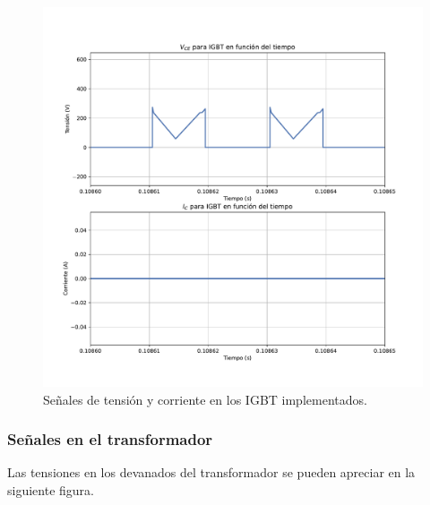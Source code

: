 \begin{figure}
	\centering
	\includegraphics[width=1\linewidth]{img/signal_IGBT}
	\caption{Señales de tensión y corriente en los IGBT implementados.}
	\label{fig:signaligbt}
\end{figure}

\subsubsection{Señales en el transformador}

Las tensiones en los devanados del transformador se pueden apreciar en la siguiente figura.

